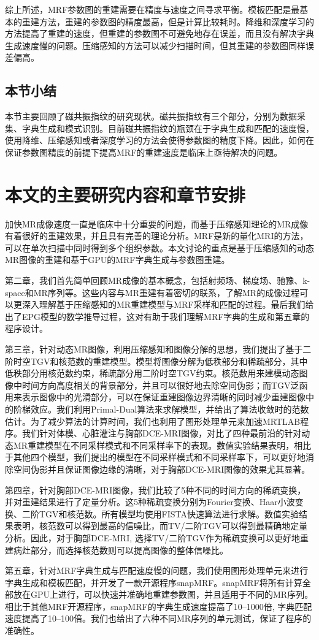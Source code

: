综上所述，MRF参数图的重建需要在精度与速度之间寻求平衡。模板匹配是最基本的重建方法，重建的参数图的精度最高，但是计算比较耗时。降维和深度学习的方法提高了重建的速度，但重建的参数图不可避免地存在误差，而且没有解决字典生成速度慢的问题。压缩感知的方法可以减少扫描时间，但其重建的参数图同样误差偏高。

\subsection{本节小结}
本节主要回顾了磁共振指纹的研究现状。磁共振指纹有三个部分，分别为数据采集、字典生成和模式识别。目前磁共振指纹的瓶颈在于字典生成和匹配的速度慢，使用降维、压缩感知或者深度学习的方法会使得参数图的精度下降。因此，如何在保证参数图精度的前提下提高MRF的重建速度是临床上亟待解决的问题。

\section{本文的主要研究内容和章节安排}
加快MR成像速度一直是临床中十分重要的问题，而基于压缩感知理论的MR成像有着很好的重建效果，并且具有完善的理论分析。MRF是新的量化MRI的方法，可以在单次扫描中同时得到多个组织参数。本文讨论的重点是基于压缩感知的动态MR图像的重建和基于GPU的MRF字典生成与参数图重建。

第二章，我们首先简单回顾MR成像的基本概念，包括射频场、梯度场、驰豫、k-space和MR序列等。这些内容与MR重建有着密切的联系，了解MR的成像过程可以更深入理解基于压缩感知的MR重建模型与MRF采样和匹配的过程。最后我们给出了EPG模型的数学推导过程，这对有助于我们理解MRF字典的生成和第五章的程序设计。

第三章，针对动态MR图像，利用压缩感知和图像分解的思想，我们提出了基于二阶时空TGV和核范数的重建模型。模型将图像分解为低秩部分和稀疏部分，其中低秩部分用核范数约束，稀疏部分用二阶时空TGV约束。核范数用来建模动态图像中时间方向高度相关的背景部分，并且可以很好地去除空间伪影；而TGV泛函用来表示图像中的光滑部分，可以在保证重建图像边界清晰的同时减少重建图像中的阶梯效应。我们利用Primal-Dual算法来求解模型，并给出了算法收敛时的范数估计。为了减少算法的计算时间，我们也利用了图形处理单元来加速MRTLAB程序。我们针对体模、心脏灌注与胸部DCE-MRI图像，对比了四种最前沿的针对动态MR重建模型在不同采样模式和不同采样率下的表现。数值实验结果表明，相比于其他四个模型，我们提出的模型在不同采样模式和不同采样率下，可以更好地消除空间伪影并且保证图像边缘的清晰，对于胸部DCE-MRI图像的效果尤其显著。

第四章，针对胸部DCE-MRI图像，我们比较了5种不同的时间方向的稀疏变换，并对重建结果进行了定量分析。这5种稀疏变换分别为Fourier变换、Haar小波变换、二阶TGV和核范数。所有模型均使用FISTA快速算法进行求解。数值实验结果表明，核范数可以得到最高的信噪比，而TV/二阶TGV可以得到最精确地定量分析。因此，对于胸部DCE-MRI, 选择TV/二阶TGV作为稀疏变换可以更好地重建病灶部分，而选择核范数则可以提高图像的整体信噪比。

第五章，针对MRF字典生成与匹配速度慢的问题，我们使用图形处理单元来进行字典生成和模板匹配，并开发了一款开源程序snapMRF。snapMRF将所有计算全部放在GPU上进行，可以快速并准确地重建参数图，并且适用于不同的MR序列。相比于其他MRF开源程序，snapMRF的字典生成速度提高了10--1000倍, 字典匹配速度提高了10--100倍。我们也给出了六种不同MR序列的单元测试，保证了程序的准确性。







